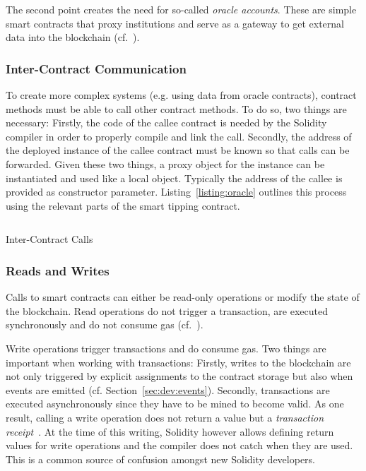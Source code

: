 The second point creates the need for so-called \emph{oracle accounts}.
These are simple smart contracts that proxy institutions and serve as a gateway to get
external data into the blockchain (cf.\ \cite{Gall18}).

\subsubsection{Inter-Contract Communication}

To create more complex systems (e.g. using data from oracle contracts),
contract methods must be able to call other contract methods.
To do so, two things are necessary:
Firstly, the code of the callee contract is needed by the Solidity compiler in order to properly compile and link the call.
Secondly, the address of the deployed instance of the callee contract must be known so that calls can be forwarded.
Given these two things, a proxy object for the instance can be instantiated and used like a local object.
Typically the address of the callee is provided as constructor parameter.
Listing~\ref{listing:oracle} outlines this process using the relevant parts of the smart tipping contract.

\begin{listing}[]
\inputminted[breaklines,fontsize=\footnotesize]{solidity}{intercontract.sol}
\caption{Inter-Contract Calls}
\label{listing:oracle}
\end{listing}

\subsubsection{Reads and Writes}

Calls to smart contracts can either be read-only operations or modify the state of the blockchain.
Read operations do not trigger a transaction, are executed synchronously and do not consume gas (cf.\ \cite{Hitchens18}).

Write operations trigger transactions and do consume gas.
Two things are important when working with transactions:
Firstly, writes to the blockchain are not only triggered by explicit assignments to the contract storage but also when events
are emitted (cf. Section~\ref{sec:dev:events}).
Secondly, transactions are executed asynchronously
since they have to be mined to become valid. As one result, calling a
write operation does not return a value but a \emph{transaction receipt}~\cite[sec. 4]{Wood18}.
At the time of this writing, Solidity however allows defining return values for
write operations and the compiler does not catch when they are used.
This is a common source of confusion amongst new Solidity developers.

